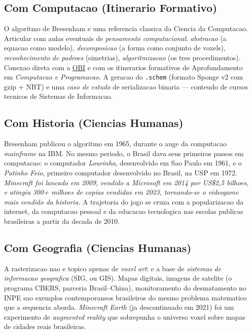 \documentclass[12pt,a4paper]{scrartcl}
\begin{document}
\subsection{Com Computacao (Itinerario Formativo)}
O algoritmo de Bresenham e uma referencia classica da Ciencia da Computacao. Articular com aulas eventuais de \emph{pensamento computacional}: \emph{abstracao} (a equacao como modelo), \emph{decomposicao} (a forma como conjunto de voxels), \emph{reconhecimento de padroes} (simetrias), \emph{algoritmizacao} (os tres procedimentos). Conexao direta com a \hyperref[sec:obmep]{OBI} e com os itinerarios formativos de Aprofundamento em \emph{Computacao e Programacao}. A geracao do \texttt{.schem} (formato Sponge v2 com gzip + NBT) e uma \emph{caso de estudo} de serializacao binaria --- conteudo de cursos tecnicos de Sistemas de Informacao.

\subsection{Com Historia (Ciencias Humanas)}
Bresenham publicou o algoritmo em 1965, durante o auge da computacao \emph{mainframe} na IBM. No mesmo periodo, o Brasil dava seus primeiros passos em computacao: o computador \emph{Lourinha}, desenvolvido em Sao Paulo em 1961, e o \emph{Patinho Feio}, primeiro computador desenvolvido no Brasil, na USP em 1972. \emph{Minecraft foi lancado em 2009, vendido a Microsoft em 2014 por US\$2{,}5 bilhoes, e atingiu 300+ milhoes de copias vendidas em 2023, tornando-se o videogame mais vendido da historia.} A trajetoria do jogo se cruza com a popularizacao da internet, da computacao pessoal e da educacao tecnologica nas escolas publicas brasileiras a partir da decada de 2010.

\subsection{Com Geografia (Ciencias Humanas)}
A rasterizacao nao e topico apenas de \emph{voxel art}: e a base de \emph{sistemas de informacao geografica} (SIG, ou GIS). Mapas digitais, imagens de satelite (o programa CBERS, parceria Brasil--China), monitoramento do desmatamento no INPE sao exemplos contemporaneos brasileiros do mesmo problema matematico que a sequencia aborda. \emph{Minecraft Earth} (ja descontinuado em 2021) foi um experimento de \emph{augmented reality} que sobrepunha o universo voxel sobre mapas de cidades reais brasileiras.
\end{document}
